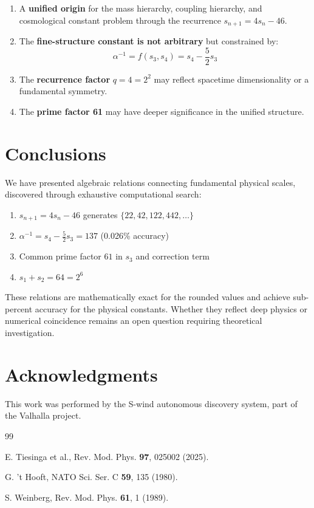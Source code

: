 \documentclass[twocolumn,prl,aps,superscriptaddress]{revtex4-2}
\begin{document}
\begin{enumerate}
\item A \textbf{unified origin} for the mass hierarchy, coupling hierarchy, 
and cosmological constant problem through the recurrence $s_{n+1} = 4s_n - 46$.

\item The \textbf{fine-structure constant is not arbitrary} but constrained by:
\begin{equation}
\alpha^{-1} = f(s_3, s_4) = s_4 - \frac{5}{2}s_3
\end{equation}

\item The \textbf{recurrence factor} $q=4=2^2$ may reflect spacetime dimensionality 
or a fundamental symmetry.

\item The \textbf{prime factor 61} may have deeper significance in the unified structure.
\end{enumerate}

\section{Conclusions}

We have presented algebraic relations connecting fundamental physical scales, 
discovered through exhaustive computational search:

\begin{enumerate}
\item $s_{n+1} = 4s_n - 46$ generates $\{22, 42, 122, 442, \ldots\}$
\item $\alpha^{-1} = s_4 - \frac{5}{2}s_3 = 137$ (0.026\% accuracy)
\item Common prime factor $61$ in $s_3$ and correction term
\item $s_1 + s_2 = 64 = 2^6$
\end{enumerate}

These relations are mathematically exact for the rounded values and achieve 
sub-percent accuracy for the physical constants. Whether they reflect 
deep physics or numerical coincidence remains an open question requiring 
theoretical investigation.

\section*{Acknowledgments}

This work was performed by the S-wind autonomous discovery system, 
part of the Valhalla project.

\begin{thebibliography}{99}

E. Tiesinga et al., Rev. Mod. Phys. \textbf{97}, 025002 (2025).

G. 't Hooft, NATO Sci. Ser. C \textbf{59}, 135 (1980).

S. Weinberg, Rev. Mod. Phys. \textbf{61}, 1 (1989).

\end{thebibliography}
\end{document}

